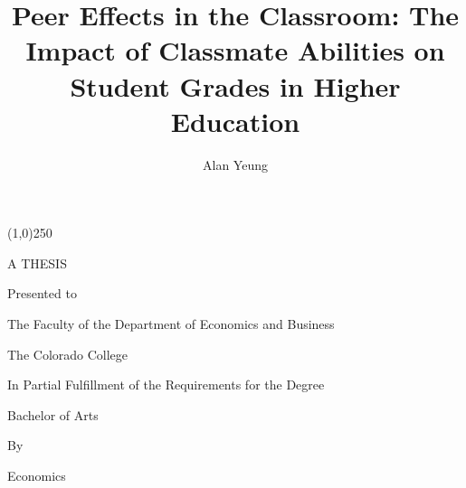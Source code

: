 \title{Peer Effects in the Classroom: The Impact of Classmate Abilities on Student Grades in Higher Education}

\author{Alan Yeung}

\begin{titlepage}
  \centering
  \vspace*{-.25cm}
  {\Large \thetitle \par}
  \vspace{1.5cm}
  \begin{center}
    \line(1,0){250}
  \end{center}
  \vspace{1.5cm}
  {A THESIS \par}
  \vspace{.25cm}
  {Presented to \par}
  \vspace{.25cm}
  {The Faculty of the Department of Economics and Business \par}
  \vspace{.25cm}
  {The Colorado College \par}
  \vspace{3cm}
  {In Partial Fulfillment of the Requirements for the Degree \par}
  \vspace{.25cm}
  {Bachelor of Arts \par}
  \vspace{.75cm}
  {By \par}
  \vspace{.25cm}
  {\theauthor \par}
  \vspace{.25cm}
  {\thedate \par}
  \vfill
\end{titlepage}

\clearpage{}

\begin{center}
  \Large \thetitle \par
  \vspace{.25cm}
  \large \theauthor \par
  \vspace{.25cm}
  \large \thedate \par
  \vspace{.25cm}
  \large Economics
\end{center}

